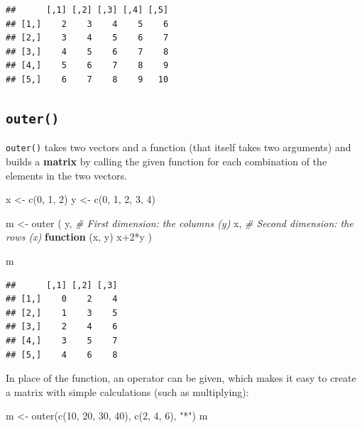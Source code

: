 \documentclass[
]{book}
\newenvironment{Shaded}{\begin{snugshade}}{\end{snugshade}}
\newcommand{\CommentTok}[1]{\textcolor[rgb]{0.56,0.35,0.01}{\textit{#1}}}
\newcommand{\ControlFlowTok}[1]{\textcolor[rgb]{0.13,0.29,0.53}{\textbf{#1}}}
\newcommand{\DecValTok}[1]{\textcolor[rgb]{0.00,0.00,0.81}{#1}}
\newcommand{\FunctionTok}[1]{\textcolor[rgb]{0.00,0.00,0.00}{#1}}
\newcommand{\NormalTok}[1]{#1}
\newcommand{\OtherTok}[1]{\textcolor[rgb]{0.56,0.35,0.01}{#1}}
\newcommand{\SpecialCharTok}[1]{\textcolor[rgb]{0.00,0.00,0.00}{#1}}
\newcommand{\StringTok}[1]{\textcolor[rgb]{0.31,0.60,0.02}{#1}}
\theoremstyle{definition}
\theoremstyle{definition}
\theoremstyle{definition}
\theoremstyle{definition}
\theoremstyle{remark}
\begin{document}
\begin{verbatim}
##      [,1] [,2] [,3] [,4] [,5]
## [1,]    2    3    4    5    6
## [2,]    3    4    5    6    7
## [3,]    4    5    6    7    8
## [4,]    5    6    7    8    9
## [5,]    6    7    8    9   10
\end{verbatim}

\hypertarget{outer}{%
\subsection{\texorpdfstring{\texttt{outer()}}{outer()}}\label{outer}}

\texttt{outer()} takes two vectors and a function (that itself takes two arguments) and builds a \textbf{matrix} by calling the given function for each combination of the elements in the two vectors.

\begin{Shaded}
\begin{Highlighting}[]
\NormalTok{x }\OtherTok{\textless{}{-}} \FunctionTok{c}\NormalTok{(}\DecValTok{0}\NormalTok{, }\DecValTok{1}\NormalTok{, }\DecValTok{2}\NormalTok{)}
\NormalTok{y }\OtherTok{\textless{}{-}} \FunctionTok{c}\NormalTok{(}\DecValTok{0}\NormalTok{, }\DecValTok{1}\NormalTok{, }\DecValTok{2}\NormalTok{, }\DecValTok{3}\NormalTok{, }\DecValTok{4}\NormalTok{)}

\NormalTok{m }\OtherTok{\textless{}{-}} \FunctionTok{outer}\NormalTok{ (}
\NormalTok{   y,     }\CommentTok{\# First dimension:  the columns (y)}
\NormalTok{   x,     }\CommentTok{\# Second dimension: the rows    (x)}
   \ControlFlowTok{function}\NormalTok{ (x, y)   x}\SpecialCharTok{+}\DecValTok{2}\SpecialCharTok{*}\NormalTok{y}
\NormalTok{)}

\NormalTok{m}
\end{Highlighting}
\end{Shaded}

\begin{verbatim}
##      [,1] [,2] [,3]
## [1,]    0    2    4
## [2,]    1    3    5
## [3,]    2    4    6
## [4,]    3    5    7
## [5,]    4    6    8
\end{verbatim}

In place of the function, an operator can be given, which makes it easy to create a matrix with simple calculations (such as multiplying):

\begin{Shaded}
\begin{Highlighting}[]
\NormalTok{m }\OtherTok{\textless{}{-}} \FunctionTok{outer}\NormalTok{(}\FunctionTok{c}\NormalTok{(}\DecValTok{10}\NormalTok{, }\DecValTok{20}\NormalTok{, }\DecValTok{30}\NormalTok{, }\DecValTok{40}\NormalTok{), }\FunctionTok{c}\NormalTok{(}\DecValTok{2}\NormalTok{, }\DecValTok{4}\NormalTok{, }\DecValTok{6}\NormalTok{), }\StringTok{"*"}\NormalTok{)}
\NormalTok{m}
\end{Highlighting}
\end{Shaded}
\end{document}
